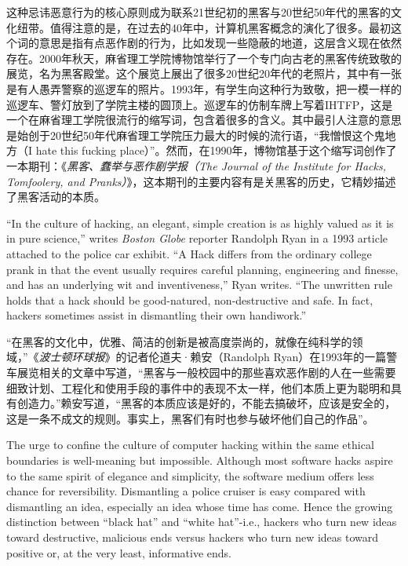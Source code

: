 \ifdefined\chs
这种忌讳恶意行为的核心原则成为联系21世纪初的黑客与20世纪50年代的黑客的文化纽带。值得注意的是，在过去的40年中，计算机黑客概念的演化了很多。最初这个词的意思是指有点恶作剧的行为，比如发现一些隐蔽的地道，这层含义现在依然存在。2000年秋天，麻省理工学院博物馆举行了一个专门向古老的黑客传统致敬的展览，名为黑客殿堂。这个展览上展出了很多20世纪20年代的老照片，其中有一张是有人愚弄警察的巡逻车的照片。1993年，有学生向这种行为致敬，把一模一样的巡逻车、警灯放到了学院主楼的圆顶上。巡逻车的仿制车牌上写着IHTFP，这是一个在麻省理工学院很流行的缩写词，包含着很多的含义。其中最引人注意的意思是始创于20世纪50年代麻省理工学院压力最大的时候的流行语，``我憎恨这个鬼地方（I hate this fucking place）''。然而，在1990年，博物馆基于这个缩写词创作了一本期刊：《\textit{黑客、蠢举与恶作剧学报（The Journal of the Institute for Hacks, Tomfoolery, and Pranks）}》，这本期刊的主要内容有是关黑客的历史，它精妙描述了黑客活动的本质。
\fi

\ifdefined\eng
``In the culture of hacking, an elegant, simple creation is as highly valued as it is in pure science,'' writes \textit{Boston Globe} reporter Randolph Ryan in a 1993 article attached to the police car exhibit. ``A Hack differs from the ordinary college prank in that the event usually requires careful planning, engineering and finesse, and has an underlying wit and inventiveness,'' Ryan writes. ``The unwritten rule holds that a hack should be good-natured, non-destructive and safe. In fact, hackers sometimes assist in dismantling their own handiwork.''
\fi

\ifdefined\chs
``在黑客的文化中，优雅、简洁的创新是被高度崇尚的，就像在纯科学的领域，''《\textit{波士顿环球报}》的记者伦道夫·赖安（Randolph Ryan）在1993年的一篇警车展览相关的文章中写道，``黑客与一般校园中的那些喜欢恶作剧的人在一些需要细致计划、工程化和使用手段的事件中的表现不太一样，他们本质上更为聪明和具有创造力。''赖安写道，``黑客的本质应该是好的，不能去搞破坏，应该是安全的，这是一条不成文的规则。事实上，黑客们有时也参与破坏他们自己的作品''。
\fi

\ifdefined\eng
The urge to confine the culture of computer hacking within the same ethical boundaries is well-meaning but impossible. Although most software hacks aspire to the same spirit of elegance and simplicity, the software medium offers less chance for reversibility. Dismantling a police cruiser is easy compared with dismantling an idea, especially an idea whose time has come. Hence the growing distinction between ``black hat'' and ``white hat''-i.e., hackers who turn new ideas toward destructive, malicious ends versus hackers who turn new ideas toward positive or, at the very least, informative ends.
\fi

